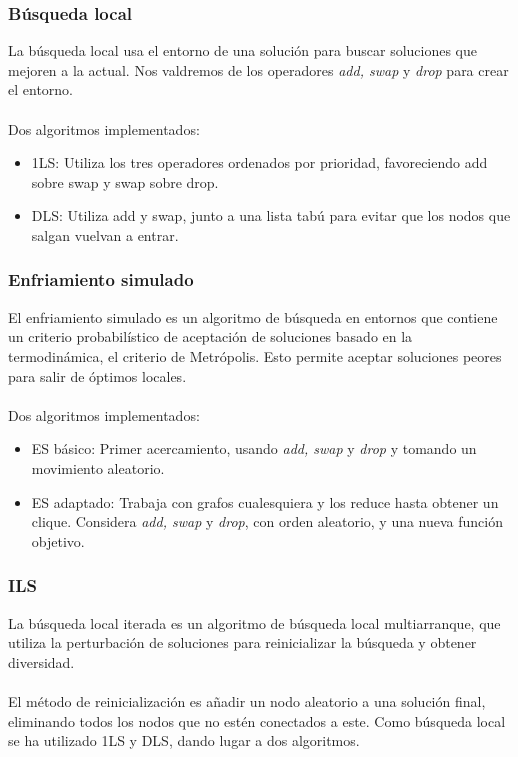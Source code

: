 \documentclass{beamer}
\theoremstyle{theorem}
\begin{document}
\begin{frame}
  \frametitle{Búsqueda local}
   La búsqueda local usa el entorno de una solución para buscar soluciones que mejoren a la actual.
   Nos valdremos de los operadores \textit{add, swap} y \textit{drop} para crear el entorno. \\~\\

  Dos algoritmos implementados:
  \begin{itemize}
    \item 1LS: Utiliza los tres operadores ordenados por prioridad, favoreciendo add sobre swap y swap sobre drop. \cite{kat:2005}
    \item DLS: Utiliza add y swap, junto a una lista tabú para evitar que los nodos que salgan vuelvan a entrar. \cite{pullan:2006}
  \end{itemize}

\end{frame}


\begin{frame}
  \frametitle{Enfriamiento simulado}
   El enfriamiento simulado es un algoritmo de búsqueda en entornos que contiene un criterio probabilístico
   de aceptación de soluciones basado en la termodinámica, el criterio de Metrópolis. Esto permite aceptar soluciones
   peores para salir de óptimos locales. \\~\\

  Dos algoritmos implementados:
  \begin{itemize}
    \item ES básico: Primer acercamiento, usando \textit{add, swap} y \textit{drop} y tomando un movimiento aleatorio.
    \item ES adaptado: Trabaja con grafos cualesquiera y los reduce hasta obtener un clique. Considera \textit{add, swap} y \textit{drop},
    con orden aleatorio, y una nueva función objetivo. \cite{geng:2007}
  \end{itemize}

\end{frame}


\begin{frame}
  \frametitle{ILS}
   La búsqueda local iterada es un algoritmo de búsqueda local multiarranque, que utiliza la perturbación de soluciones para
   reinicializar la búsqueda y obtener diversidad. \\~\\

   El método de reinicialización es añadir un nodo aleatorio a una solución final, eliminando todos los nodos que no estén
   conectados a este. Como búsqueda local se ha utilizado 1LS y DLS, dando lugar a dos algoritmos.

\end{frame}
\end{document}
